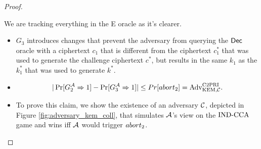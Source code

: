 \documentclass{article}
\begin{document}
\begin{proof}
\begin{itemize}
                                                                                We are tracking everything in the E oracle as it's clearer. 
                                                                            \end{itemize}

                                                                            \begin{itemize}
                                                                            \item[\textbf{Game 3}]
                                                                                $G_3$ introduces changes that prevent the adversary from querying the $\textsf{Dec}$ oracle with a ciphertext $c_1$ that is different from the ciphertext $c^*_1$ that was used to generate the challenge ciphertext $c^*$, but results in the same $k_1$ as the $k^*_1$ that was used to generate $k^*$.

                                                                            \item[\emph{Claim 3}]

                                                                                \[ | \Pr[G^{\mathcal{A}}_{2} \Rightarrow 1] - \Pr[G^{\mathcal{A}}_{3} \Rightarrow 1] | \leq Pr[abort_2] = \text{Adv}_{\text{KEM}, \mathcal{C}}^{\text{C2PRI}}. \]

                                                                            \item[\emph{Proof}]
                                                                                To prove this claim, we show the existence of an adversary $\mathcal{C}$, depicted in Figure \ref{fig:adversary_kem_coll}, that simulates $\mathcal{A}$'s view on the $\text{IND-CCA}$ game and wins iff $\mathcal{A}$ would trigger $abort_2$.


\end{itemize}
\end{proof}
\end{document}
